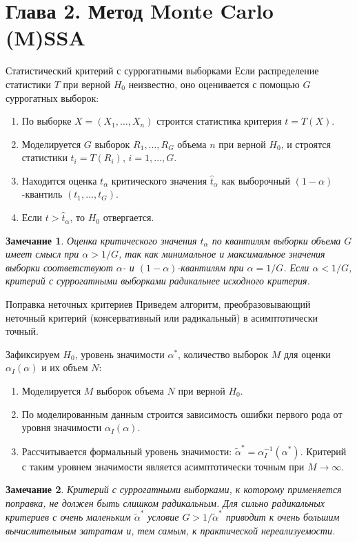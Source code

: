 \documentclass[pdf,notheorems,10pt,intlimits, unicode]{beamer}
\newtheorem{remark}{Замечание}
\begin{document}
\section{Глава 2. Метод Monte Carlo (M)SSA}
\begin{frame}{Статистический критерий с суррогатными выборками}
  Если распределение статистики $T$ при верной $H_0$ неизвестно, оно оценивается с помощью $G$ суррогатных выборок:
  \begin{enumerate}
    \item По выборке $X=(X_1,\ldots, X_n)$ строится статистика критерия $t=T(X)$.
    \item Моделируется $G$ выборок $R_1,\ldots, R_G$ объема $n$ при верной $H_0$, и строятся статистики $t_i=T(R_i)$, $i=1,\ldots, G$.
		\item Находится оценка $t_\alpha$ критического значения $\hat t_\alpha$ как выборочный $(1-\alpha)$-квантиль $(t_1,\ldots,t_G)$.
    \item Если $t>\hat t_\alpha$, то $H_0$ отвергается.
  \end{enumerate}

  \begin{remark}
    Оценка критического значения $t_\alpha$ по квантилям выборки объема $G$ имеет смысл при $\alpha>1/G$, так как минимальное и максимальное значения выборки соответствуют $\alpha$- и $(1-\alpha)$-квантилям при $\alpha = 1/G$. Если $\alpha < 1/G$, критерий с суррогатными выборками радикальнее исходного критерия.
  \end{remark}
\end{frame}

\begin{frame}{Поправка неточных критериев}
  Приведем алгоритм, преобразовывающий неточный критерий (консервативный или радикальный) в асимптотически точный.\medskip

  Зафиксируем $H_0$, уровень значимости $\alpha^*$, количество выборок $M$ для оценки $\alpha_I(\alpha)$ и их объем $N$:
  \begin{enumerate}
    \item Моделируется $M$ выборок объема $N$ при верной $H_0$.
    \item По моделированным данным строится зависимость ошибки первого рода от уровня значимости $\alpha_I(\alpha)$.
    \item Рассчитывается формальный уровень значимости: $\widetilde{\alpha}^*=\alpha_I^{-1}(\alpha^*)$. Критерий с таким уровнем значимости является асимптотически точным при $M\to\infty$.
   \end{enumerate}

  \begin{remark}
    Критерий с суррогатными выборками, к которому применяется поправка, не должен быть слишком радикальным. Для сильно радикальных критериев с очень маленьким $\widetilde\alpha^*$ условие $G > 1/\widetilde\alpha^*$ приводит к очень большим вычислительным затратам и, тем самым, к практической нереализуемости.
  \end{remark}
\end{frame}
\end{document}
